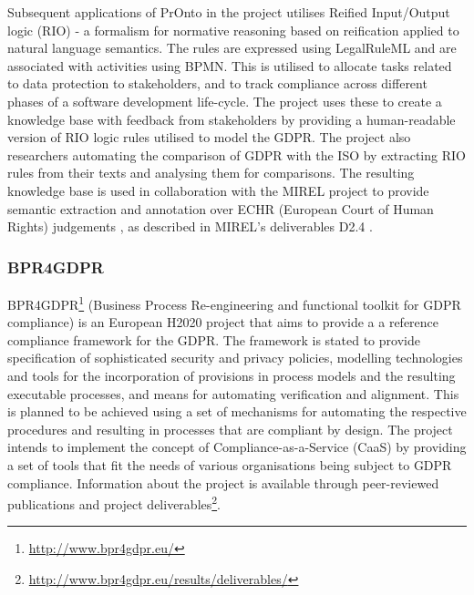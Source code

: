 Subsequent applications of PrOnto in the project utilises Reified Input/Output logic (RIO) \cite{robaldo_reified_2017} - a formalism for normative reasoning based on reification applied to natural language semantics. The rules are expressed using LegalRuleML and are associated with activities using BPMN. This is utilised to allocate tasks related to data protection to stakeholders, and to track compliance across different phases of a software development life-cycle.
The project uses these to create a knowledge base \cite{bartolini_agile_2019} with feedback from stakeholders by providing a human-readable version of RIO logic rules utilised to model the GDPR. 
The project also researchers automating the comparison of GDPR with the ISO by extracting RIO rules from their texts and analysing them for comparisons.
The resulting knowledge base is used in collaboration with the MIREL project to provide semantic extraction and annotation over ECHR (European Court of Human Rights) judgements \cite{cardellino_legal_2017}, as described in MIREL's deliverables D2.4 \cite{robaldo_livio_d2.4_2017}.

\subsubsection{BPR4GDPR}\label{sec:sota:BPR4GDPR}
BPR4GDPR\footnote{\url{http://www.bpr4gdpr.eu/}} (Business Process Re-engineering and functional toolkit for GDPR compliance) is an European H2020 project that aims to provide a a reference compliance framework for the GDPR. The framework is stated to provide specification of sophisticated security and privacy policies, modelling technologies and tools for the incorporation of provisions in process models and the resulting executable processes, and means for automating verification and alignment.
This is planned to be achieved using a set of mechanisms for automating the respective procedures and resulting in processes that are compliant by design.
The project intends to implement the concept of Compliance-as-a-Service (CaaS) by providing a set of tools that fit the needs of various organisations being subject to GDPR compliance.
Information about the project is available through peer-reviewed publications and project deliverables\footnote{\url{http://www.bpr4gdpr.eu/results/deliverables/}}.

